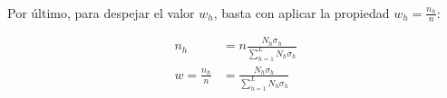 \documentclass{article}
\begin{document}
    \paragraph{}
    Por último, para despejar el valor $w_h$, basta con aplicar la propiedad $w_h=\frac{n_h}{n}$:

    \begin{align}
      n_h &= n\frac{N_h \sigma_h}{\sum\limits_{h=1}^L N_h \sigma_h } \\
      w = \frac{n_h}{n} &=\frac{N_h \sigma_h}{\sum\limits_{h=1}^L N_h \sigma_h }
    \end{align}

  \nocite{muest2017}
  \nocite{sarndal2003model}

  
  
\end{document}
